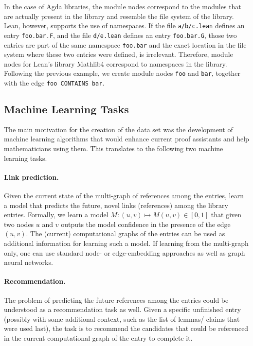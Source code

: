 \documentclass{article}
\begin{document}
In the case of Agda libraries, the module nodes correspond to the modules that are actually present in the library and resemble the file system of the library. Lean, however, supports the use of namespaces. If the file \texttt{a/b/c.lean} defines an entry \texttt{foo.bar.F}, and the file \texttt{d/e.lean} defines an entry \texttt{foo.bar.G}, those two entries are part of the same namespace \texttt{foo.bar} and the exact location in the file system where these two entries were defined, is irrelevant. Therefore, module nodes for Lean's library Mathlib4 correspond to namespaces in the library. Following the previous example, we create module nodes \texttt{foo} and \texttt{bar}, together with the edge \texttt{foo CONTAINS bar}.

\subsection{Machine Learning Tasks}
The main motivation for the creation of the data set was the development of machine learning algorithms that would enhance current proof assistants and help mathematicians using them. This translates to the following two machine learning tasks.

\paragraph{Link prediction.} Given the current state of the multi-graph of references among the entries, learn a model that predicts the future, novel links (references) among the library entries. Formally, we learn a model $M: (u, v)\mapsto M(u, v) \in [0, 1]$ that given two nodes $u$ and $v$ outputs the model confidence in the presence of the edge $(u, v)$. The (current) computational graphs of the entries can be used as additional information for learning such a model. If learning from the multi-graph only, one can use standard node- or edge-embedding approaches as well as graph neural networks.

\paragraph{Recommendation.} The problem of predicting the future references among the entries could be understood as a recommendation task as well. Given a specific unfinished entry (possibly with some additional context, such as the list of lemmas/ claims that were used last), the task is to recommend the candidates that could be referenced in the current computational graph of the entry to complete it.
\end{document}
